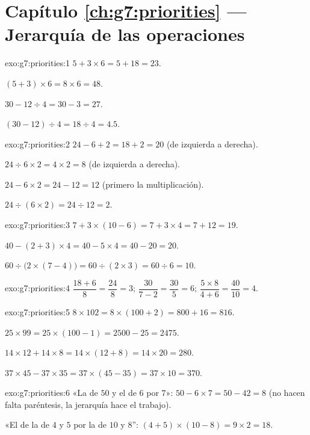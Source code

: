 \section*{Capítulo \ref{ch:g7:priorities} --- Jerarquía de las operaciones}

\begin{solution}{exo:g7:priorities:1}
$5 + 3 \times 6 = 5 + 18 = 23$.

$(5 + 3) \times 6 = 8 \times 6 = 48$.

$30 - 12 \div 4 = 30 - 3 = 27$.

$(30 - 12) \div 4 = 18 \div 4 = 4.5$.
\end{solution}

\begin{solution}{exo:g7:priorities:2}
$24 - 6 + 2 = 18 + 2 = 20$ (de izquierda a derecha).

$24 \div 6 \times 2 = 4 \times 2 = 8$ (de izquierda a derecha).

$24 - 6 \times 2 = 24 - 12 = 12$ (primero la multiplicación).

$24 \div (6 \times 2) = 24 \div 12 = 2$.
\end{solution}

\begin{solution}{exo:g7:priorities:3}
$7 + 3 \times (10 - 6) = 7 + 3 \times 4 = 7 + 12 = 19$.

$40 - (2 + 3) \times 4 = 40 - 5 \times 4 = 40 - 20 = 20$.

$60 \div \bigl(2 \times (7 - 4)\bigr) = 60 \div (2 \times 3)
= 60 \div 6 = 10$.
\end{solution}

\begin{solution}{exo:g7:priorities:4}
$\dfrac{18 + 6}{8} = \dfrac{24}{8} = 3$; \quad
$\dfrac{30}{7 - 2} = \dfrac{30}{5} = 6$; \quad
$\dfrac{5 \times 8}{4 + 6} = \dfrac{40}{10} = 4$.
\end{solution}

\begin{solution}{exo:g7:priorities:5}
$8 \times 102 = 8 \times (100 + 2) = 800 + 16 = 816$.

$25 \times 99 = 25 \times (100 - 1) = 2500 - 25 = 2475$.

$14 \times 12 + 14 \times 8 = 14 \times (12 + 8) = 14 \times 20 = 280$.

$37 \times 45 - 37 \times 35 = 37 \times (45 - 35) = 37 \times 10 =
370$.
\end{solution}

\begin{solution}{exo:g7:priorities:6}
«La  de $50$ y el  de $6$ por $7$»:
$50 - 6 \times 7 = 50 - 42 = 8$ (no hacen falta paréntesis, la jerarquía hace
el trabajo).

«El  de la  de $4$ y $5$ por la  de $10$ y
$8$'': $(4 + 5) \times (10 - 8) = 9 \times 2 = 18$.
\end{solution}

